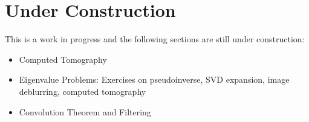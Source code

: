 \section*{Under Construction}

This is a work in progress and the following sections are still under construction:

\begin{itemize}
\item Computed Tomography
\item Eigenvalue Problems: Exercises on pseudoinverse, SVD expansion, image deblurring, computed tomography 
\item Convolution Theorem and Filtering
\end{itemize}